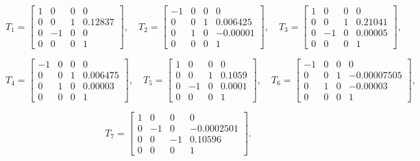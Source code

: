 \documentclass[10pt]{article}
\begin{document}
\begin{equation}
T_1 = \begin{bmatrix} 
1 & 0 & 0 & 0 \\ 
0 & 0 & 1 & 0.12837 \\ 
0 & -1 & 0 & 0 \\ 
0 & 0 & 0 & 1 
\end{bmatrix}, \quad
T_2 = \begin{bmatrix} 
-1 & 0 & 0 & 0 \\ 
0 & 0 & 1 & 0.006425 \\ 
0 & 1 & 0 & -0.00001 \\ 
0 & 0 & 0 & 1 
\end{bmatrix}, \quad
T_3 = \begin{bmatrix} 
1 & 0 & 0 & 0 \\ 
0 & 0 & 1 & 0.21041 \\ 
0 & -1 & 0 & 0.00005 \\ 
0 & 0 & 0 & 1 
\end{bmatrix}, 
\end{equation}

\begin{equation}
T_4 = \begin{bmatrix} 
-1 & 0 & 0 & 0 \\ 
0 & 0 & 1 & 0.006475 \\ 
0 & 1 & 0 & 0.00003 \\ 
0 & 0 & 0 & 1 
\end{bmatrix}, \quad
T_5 = \begin{bmatrix} 
1 & 0 & 0 & 0 \\ 
0 & 0 & 1 & 0.1059 \\ 
0 & -1 & 0 & 0.0001 \\ 
0 & 0 & 0 & 1 
\end{bmatrix}, \quad
T_6 = \begin{bmatrix} 
-1 & 0 & 0 & 0 \\ 
0 & 0 & 1 & -0.00007505 \\ 
0 & 1 & 0 & -0.00003 \\ 
0 & 0 & 0 & 1 
\end{bmatrix},
\end{equation}

\begin{equation}
T_7 = \begin{bmatrix} 
1 & 0 & 0 & 0 \\ 
0 & -1 & 0 & -0.0002501 \\ 
0 & 0 & -1 & 0.10596 \\ 
0 & 0 & 0 & 1 
\end{bmatrix}.
\end{equation}
\end{document}
